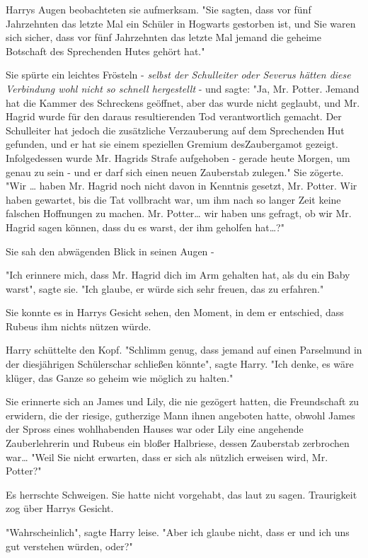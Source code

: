 {Harrys Augen beobachteten sie aufmerksam. "Sie sagten, dass vor fünf Jahrzehnten das letzte Mal ein Schüler in Hogwarts gestorben ist, und Sie waren sich sicher, dass vor fünf Jahrzehnten das letzte Mal jemand die geheime Botschaft des Sprechenden Hutes gehört hat."

Sie spürte ein leichtes Frösteln - \emph{selbst der Schulleiter oder Severus hätten diese Verbindung wohl nicht so schnell hergestellt} - und sagte: "Ja, Mr. Potter. Jemand hat die Kammer des Schreckens geöffnet, aber das wurde nicht geglaubt, und Mr. Hagrid wurde für den daraus resultierenden Tod verantwortlich gemacht. Der Schulleiter hat jedoch die zusätzliche Verzauberung auf dem Sprechenden Hut gefunden, und er hat sie einem speziellen Gremium desZaubergamot gezeigt. Infolgedessen wurde Mr. Hagrids Strafe aufgehoben - gerade heute Morgen, um genau zu sein - und er darf sich einen neuen Zauberstab zulegen." Sie zögerte. "Wir … haben Mr. Hagrid noch nicht davon in Kenntnis gesetzt, Mr. Potter. Wir haben gewartet, bis die Tat vollbracht war, um ihm nach so langer Zeit keine falschen Hoffnungen zu machen. Mr. Potter… wir haben uns gefragt, ob wir Mr. Hagrid sagen können, dass du es warst, der ihm geholfen hat…?"

Sie sah den abwägenden Blick in seinen Augen -

"Ich erinnere mich, dass Mr. Hagrid dich im Arm gehalten hat, als du ein Baby warst", sagte sie. "Ich glaube, er würde sich sehr freuen, das zu erfahren."

Sie konnte es in Harrys Gesicht sehen, den Moment, in dem er entschied, dass Rubeus ihm nichts nützen würde.

Harry schüttelte den Kopf. "Schlimm genug, dass jemand auf einen Parselmund in der diesjährigen Schülerschar schließen könnte", sagte Harry. "Ich denke, es wäre klüger, das Ganze so geheim wie möglich zu halten."

Sie erinnerte sich an James und Lily, die nie gezögert hatten, die Freundschaft zu erwidern, die der riesige, gutherzige Mann ihnen angeboten hatte, obwohl James der Spross eines wohlhabenden Hauses war oder Lily eine angehende Zauberlehrerin und Rubeus ein bloßer Halbriese, dessen Zauberstab zerbrochen war… "Weil Sie nicht erwarten, dass er sich als nützlich erweisen wird, Mr. Potter?"

Es herrschte Schweigen. Sie hatte nicht vorgehabt, das laut zu sagen. Traurigkeit zog über Harrys Gesicht.

"Wahrscheinlich", sagte Harry leise. "Aber ich glaube nicht, dass er und ich uns gut verstehen würden, oder?"

}
